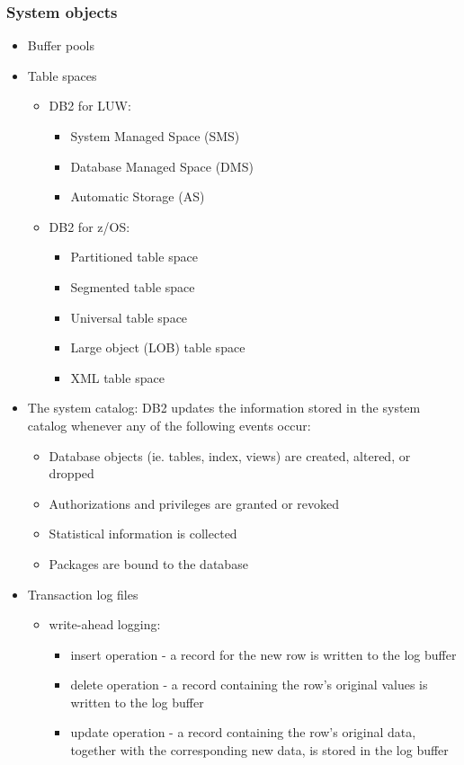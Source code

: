 \documentclass{article}
\begin{document}
\subsubsection{System objects}
	\begin{itemize}
	\item Buffer pools
	\item Table spaces
		\begin{itemize}
		\item DB2 for LUW:
			\begin{itemize}
			\item System Managed Space (SMS)
			\item Database Managed Space (DMS)
			\item Automatic Storage (AS)
			\end{itemize}
		\item DB2 for z/OS:
			\begin{itemize}
			\item Partitioned table space
			\item Segmented table space
			\item Universal table space
			\item Large object (LOB) table space
			\item XML table space
			\end{itemize}
		\end{itemize}
	\item The system catalog: DB2 updates the information stored in the system catalog whenever any
	of the following events occur:
		\begin{itemize}
		\item Database objects (ie. tables, index, views) are created, altered, or dropped
		\item Authorizations and privileges are granted or revoked
		\item Statistical information is collected
		\item Packages are bound to the database
		\end{itemize}
	\item Transaction log files
		\begin{itemize}
		\item write-ahead logging:
			\begin{itemize}
			\item insert operation - a record for the new row is written to the log buffer
			\item delete operation - a record containing the row's original values is written to the log
			buffer
			\item update operation - a record containing the row's original data, together with the 
			corresponding new data, is stored in the log buffer
			

\end{itemize}
\end{itemize}
\end{itemize}
\end{document}
